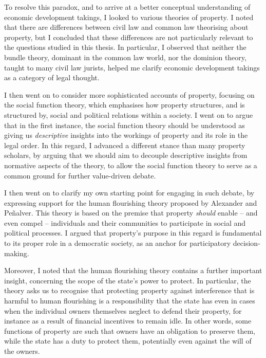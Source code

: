 {To resolve this paradox, and to arrive at a better conceptual understanding of economic development takings, I looked to various theories of property. I noted that there are differences between civil law and common law theorising about property, but I concluded that these differences are not particularly relevant to the questions studied in this thesis. In particular, I observed that neither the bundle theory, dominant in the common law world, nor the dominion theory, taught to many civil law jurists, helped me clarify economic development takings as a category of legal thought.

I then went on to consider more sophisticated accounts of property, focusing on the social function theory, which emphasises how property structures, and is structured by, social and political relations within a society. I went on to argue that in the first instance, the social function theory should be understood as giving us {\it descriptive} insights into the workings of property and its role in the legal order. In this regard, I advanced a different stance than many property scholars, by arguing that we should aim to decouple descriptive insights from normative aspects of the theory, to allow the social function theory to serve as a common ground for further value-driven debate.

I then went on to clarify my own starting point for engaging in such debate, by expressing support for the human flourishing theory proposed by Alexander and Pe\~{n}alver. This theory is based on the premise that property {\it should} enable -- and even compel -- individuals and their communities to  participate in social and political processes. I argued that property's purpose in this regard is  fundamental to its proper role in a democratic society, as an anchor for participatory decision-making.  

Moreover, I noted that the human flourishing theory contains a further important insight, concerning the scope of the state's power to protect. In particular, the theory asks us to recognise that protecting property against interference that is harmful to human flourishing is a responsibility that the state has even in cases when the individual owners themselves neglect to defend their property, for instance as a result of financial incentives to remain idle. In other words, some functions of property are such that owners have an obligation to preserve them, while the state has a duty to protect them, potentially even against the will of the owners.

}
